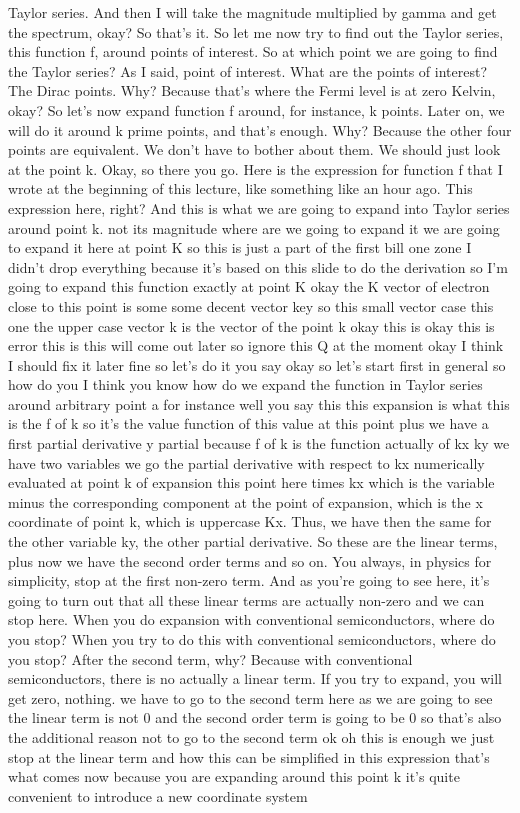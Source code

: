 Taylor series. And then I will take the magnitude multiplied by gamma and get the spectrum, okay? So that's it.
So let me now try to find out the Taylor series, this function f, around points of interest. So at which point we are going to find the Taylor series? As I said, point of interest. What are the points of interest? The Dirac points. Why? Because that's where the Fermi level is at zero Kelvin, okay? So let's now expand function f around, for instance, k points. Later on, we will do it around k prime points, and that's enough. Why? Because the other four points are equivalent. We don't have to bother about them. We should just look at the point k. Okay, so there you go. Here is the expression for function f that I wrote at the beginning of this lecture, like something like an hour ago. This expression here, right? And this is what we are going to expand into Taylor series around point k. not its magnitude where are we going to expand it we are going to expand it here at point K so this is just a part of the first bill one zone I didn't drop everything because it's based on this slide to do the derivation so I'm going to expand this function exactly at point K okay the K vector of electron close to this point is some some decent vector key so this small vector case this one the upper case vector k is the vector of the point k okay this is okay this is error this is this will come out later so ignore this Q at the moment okay I think I should fix it later fine so let's do it you say okay so let's start first in general so how do you I think you know how do we expand the function in Taylor series around arbitrary point a for instance well you say this this expansion is what this is the f of k so it's the value function of this value at this point plus we have a first partial derivative y partial because f of k is the function actually of kx ky we have two variables we go the partial derivative with respect to kx numerically evaluated at point k of expansion this point here times kx which is the variable minus the corresponding component at the point of expansion, which is the x coordinate of point k, which is uppercase Kx. Thus, we have then the same for the other variable ky, the other partial derivative. So these are the linear terms, plus now we have the second order terms and so on. You always, in physics for simplicity, stop at the first non-zero term. And as you're going to see here, it's going to turn out that all these linear terms are actually non-zero and we can stop here. When you do expansion with conventional semiconductors, where do you stop? When you try to do this with conventional semiconductors, where do you stop? After the second term, why? Because with conventional semiconductors, there is no actually a linear term. If you try to expand, you will get zero, nothing. we have to go to the second term here as we are going to see the linear term is not 0 and the second order term is going to be 0 so that's also the additional reason not to go to the second term ok oh this is enough we just stop at the linear term and how this can be simplified in this expression that's what comes now because you are expanding around this point k it's quite convenient to introduce a new coordinate system 